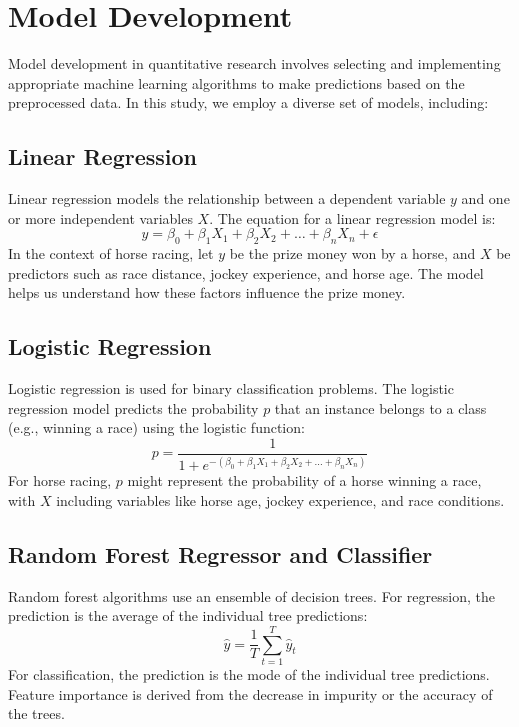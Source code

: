\documentclass{article}
\begin{document}
\section*{Model Development}
Model development in quantitative research involves selecting and implementing appropriate machine learning algorithms to make predictions based on the preprocessed data. In this study, we employ a diverse set of models, including:

\subsection*{Linear Regression}
Linear regression models the relationship between a dependent variable \( y \) and one or more independent variables \( X \). The equation for a linear regression model is:
\begin{equation}
y = \beta_0 + \beta_1 X_1 + \beta_2 X_2 + \ldots + \beta_n X_n + \epsilon
\end{equation}
In the context of horse racing, let \( y \) be the prize money won by a horse, and \( X \) be predictors such as race distance, jockey experience, and horse age. The model helps us understand how these factors influence the prize money.

\subsection*{Logistic Regression}
Logistic regression is used for binary classification problems. The logistic regression model predicts the probability \( p \) that an instance belongs to a class (e.g., winning a race) using the logistic function:
\begin{equation}
p = \frac{1}{1 + e^{-(\beta_0 + \beta_1 X_1 + \beta_2 X_2 + \ldots + \beta_n X_n)}}
\end{equation}
For horse racing, \( p \) might represent the probability of a horse winning a race, with \( X \) including variables like horse age, jockey experience, and race conditions.

\subsection*{Random Forest Regressor and Classifier}
Random forest algorithms use an ensemble of decision trees. For regression, the prediction is the average of the individual tree predictions:
\begin{equation}
\hat{y} = \frac{1}{T} \sum_{t=1}^T \hat{y}_t
\end{equation}
For classification, the prediction is the mode of the individual tree predictions. Feature importance is derived from the decrease in impurity or the accuracy of the trees.
\end{document}
